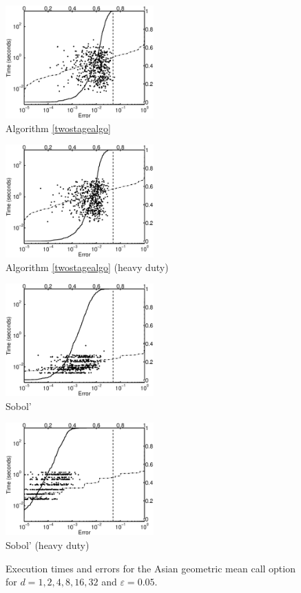 \documentclass[graybox]{svmult}
\begin{document}
\begin{figure}
\centering
\begin{minipage}{5.7cm} \centering 
\includegraphics[width=5.7cm]{137geomeaniidErrTime.eps} \\ Algorithm \ref{twostagealgo} \end{minipage}
\begin{minipage}{5.7cm} \centering \includegraphics[width=5.7cm]{137geomeaniidheavyErrTime.eps} \\ Algorithm \ref{twostagealgo} (heavy duty)\end{minipage}
\begin{minipage}{5.7cm} \centering \includegraphics[width=5.7cm]{137geomeanSobolErrTime.eps} \\ Sobol' \end{minipage}
\begin{minipage}{5.7cm} \centering \includegraphics[width=5.7cm]{137geomeanSobolheavyErrTime.eps} \\ Sobol' (heavy duty) \end{minipage}
\caption{Execution times and errors for the Asian geometric mean call option for $d=1, 2, 4, 8, 16, 32$ and $\varepsilon=0.05$.\label{AsianGeoMeanCallFig}}
\end{figure}
\end{document}
